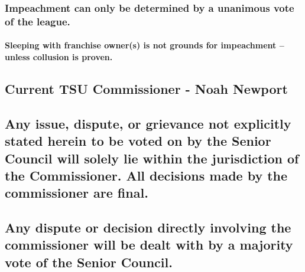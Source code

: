 \documentclass[
]{book}
\begin{document}
\hypertarget{impeachment-can-only-be-determined-by-a-unanimous-vote-of-the-league.}{%
\subsubsection{Impeachment can only be determined by a unanimous vote of the league.}\label{impeachment-can-only-be-determined-by-a-unanimous-vote-of-the-league.}}

\hypertarget{sleeping-with-franchise-owners-is-not-grounds-for-impeachment-unless-collusion-is-proven.}{%
\paragraph{Sleeping with franchise owner(s) is not grounds for impeachment -- unless collusion is proven.}\label{sleeping-with-franchise-owners-is-not-grounds-for-impeachment-unless-collusion-is-proven.}}

\hypertarget{current-tsu-commissioner---noah-newport}{%
\subsection{Current TSU Commissioner - Noah Newport}\label{current-tsu-commissioner---noah-newport}}

\hypertarget{any-issue-dispute-or-grievance-not-explicitly-stated-herein-to-be-voted-on-by-the-senior-council-will-solely-lie-within-the-jurisdiction-of-the-commissioner.-all-decisions-made-by-the-commissioner-are-final.}{%
\subsection{Any issue, dispute, or grievance not explicitly stated herein to be voted on by the Senior Council will solely lie within the jurisdiction of the Commissioner. All decisions made by the commissioner are final.}\label{any-issue-dispute-or-grievance-not-explicitly-stated-herein-to-be-voted-on-by-the-senior-council-will-solely-lie-within-the-jurisdiction-of-the-commissioner.-all-decisions-made-by-the-commissioner-are-final.}}

\hypertarget{any-dispute-or-decision-directly-involving-the-commissioner-will-be-dealt-with-by-a-majority-vote-of-the-senior-council.}{%
\subsection{Any dispute or decision directly involving the commissioner will be dealt with by a majority vote of the Senior Council.}\label{any-dispute-or-decision-directly-involving-the-commissioner-will-be-dealt-with-by-a-majority-vote-of-the-senior-council.}}
\end{document}
